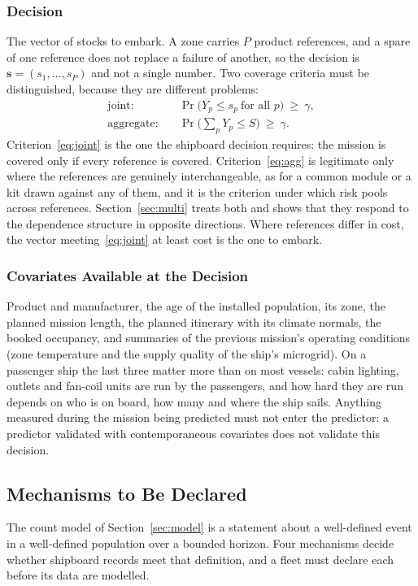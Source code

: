 \subsubsection{Decision}
The vector of stocks to embark. A zone carries $P$ product
references, and a spare of one reference does not replace a failure of another,
so the decision is $\mathbf s=(s_1,\dots,s_P)$ and not a single number. Two
coverage criteria must be distinguished, because they are different problems:
\begin{align}
\text{joint:}\quad &\Pr\big(Y_p\le s_p\ \text{for all } p\big)\ \ge\ \gamma,
\label{eq:joint}\\
\text{aggregate:}\quad &\Pr\Big(\textstyle\sum_p Y_p\le S\Big)\ \ge\ \gamma .
\label{eq:agg}
\end{align}
Criterion~\eqref{eq:joint} is the one the shipboard decision requires: the
mission is covered only if every reference is covered.
Criterion~\eqref{eq:agg} is legitimate only where the references are genuinely
interchangeable, as for a common module or a kit drawn against any of them, and
it is the criterion under which risk pools across references.
Section~\ref{sec:multi} treats both and shows that they respond to the
dependence structure in opposite directions. Where references differ in cost,
the vector meeting~\eqref{eq:joint} at least cost is the one to embark.

\subsubsection{Covariates Available at the Decision}
Product and manufacturer, the age
of the installed population, its zone, the planned mission length, the planned
itinerary with its climate normals, the booked occupancy, and summaries of the
previous mission's operating conditions (zone temperature and the supply
quality of the ship's microgrid). On a passenger ship the last three matter more
than on most vessels: cabin lighting, outlets and fan-coil units are run by the
passengers, and how hard they are run depends on who is on board, how many and
where the ship sails. Anything measured
during the mission being predicted must not enter the predictor: a predictor
validated with contemporaneous covariates does not validate this decision.

\subsection{Mechanisms to Be Declared}
\label{sec:mechanisms}
The count model of Section~\ref{sec:model} is a statement about a well-defined
event in a well-defined population over a bounded horizon. Four mechanisms
decide whether shipboard records meet that definition, and a fleet must declare
each before its data are modelled.

